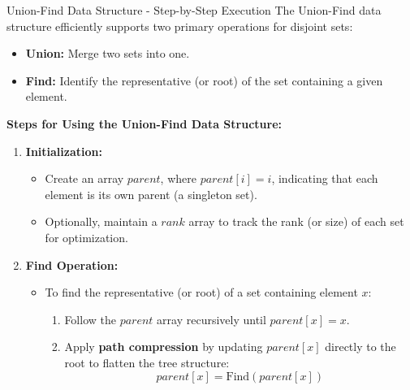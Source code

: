\newpage
{}
\begin{usage}[]{Union-Find Data Structure - Step-by-Step Execution}
    The Union-Find data structure efficiently supports two primary operations for disjoint sets:
    \begin{itemize}
        \item \textbf{Union:} Merge two sets into one.
        \item \textbf{Find:} Identify the representative (or root) of the set containing a given element.
    \end{itemize}

    \textbf{Steps for Using the Union-Find Data Structure:}

    \begin{enumerate}
        \item \textbf{Initialization:}
              \begin{itemize}
                  \item Create an array \(parent\), where \(parent[i] = i\), indicating that each element is its own parent (a singleton set).
                  \item Optionally, maintain a \(rank\) array to track the rank (or size) of each set for optimization.
              \end{itemize}

        \item \textbf{Find Operation:}
              \begin{itemize}
                  \item To find the representative (or root) of a set containing element \(x\):
                        \begin{enumerate}
                            \item Follow the \(parent\) array recursively until \(parent[x] = x\).
                            \item Apply \textbf{path compression} by updating \(parent[x]\) directly to the root to flatten the tree structure:
                                  \[
                                      parent[x] = \text{Find}(parent[x])
                                  \]
                        \end{enumerate}
              \end{itemize}


\end{enumerate}
\end{usage}
